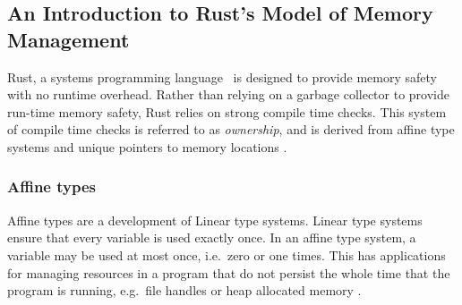 \subsection{An Introduction to Rust's Model of Memory Management}
Rust, a systems programming language~\cite{rust} is designed to provide memory
safety with no runtime overhead. Rather than relying on a garbage collector to
provide run-time memory safety, Rust relies on strong compile time checks.
This system of compile time checks is referred to as \textit{ownership}, and is
derived from affine type systems and unique pointers to memory
locations\cite{rust-borrowing} \cite{levy2015ownership}.

\subsubsection{Affine types}
Affine types are a development of Linear type systems. Linear type systems
ensure that every variable is used exactly once. In an affine type system, a
variable may be used at most once, i.e.\ zero or one times. This has applications
for managing resources in a program that do not persist the whole time that the
program is running, e.g.\ file handles or heap allocated memory \cite{attapl}
\cite{tovAffine}.

